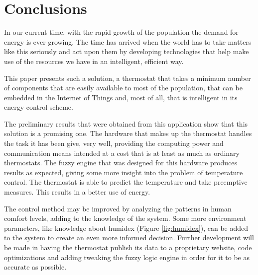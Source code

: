 
\chapter{Conclusions}
\label{chap:concth}

\qquad In our current time, with the rapid growth of the population the demand for energy is ever growing.
The time has arrived when the world has to take matters like this seriously and act upon them by developing
technologies that help make use of the resources we have in an intelligent, efficient way.

\qquad This paper presents such a solution, a thermostat that takes a minimum number of components that are
easily available to most of the population, that can be embedded in the Internet of Things and, most of all,
that is intelligent in its energy control scheme.

\qquad The preliminary results that were obtained from this application show that this solution is a promising
one. The hardware that makes up the thermostat handles the task it has been give, very well, providing the
computing power and communication means intended at a cost that is at least as much as ordinary thermostats.
The fuzzy engine that was designed for this hardware produces results as expected, giving some more insight
into the problem of temperature control. The thermostat is able to predict the temperature and take preemptive
measures. This results in a better use of energy.

\qquad The control method may be improved by analyzing the patterns in  human comfort levels, adding to the
knowledge of the system. Some more environment parameters, like knowledge about humidex (Figure
\ref{fig:humidex}), can be added to the system to create an even more informed decision. Further development
will be made in having the thermostat publish its data to a proprietary website, code optimizations and
adding tweaking the fuzzy logic engine in order for it to be as accurate as possible.
